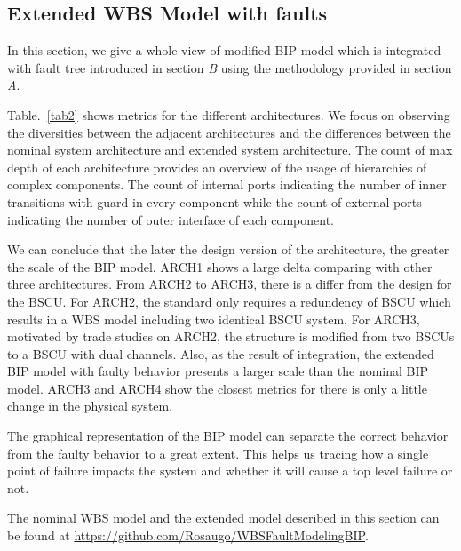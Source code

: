 \subsection{Extended WBS Model with faults}
In this section, we give a whole view of modified BIP model which is integrated with fault tree introduced in section \emph{B} using the methodology provided in section \emph{A}.

Table.~\ref{tab2} shows metrics for the different architectures. We focus on observing the diversities between the adjacent architectures and the differences between the nominal system architecture and extended system architecture. The count of max depth of each architecture provides an overview of the usage of hierarchies of complex components. The count of internal ports indicating the number of inner transitions with guard in every component while the count of external ports indicating the number of outer interface of each component.

We can conclude that the later the design version of the architecture, the greater the scale of the BIP model. ARCH1 shows a large delta comparing with other three architectures. From ARCH2 to ARCH3, there is a differ from the design for the BSCU. For ARCH2, the standard only requires a redundency of BSCU which results in a WBS model including two identical BSCU system. For ARCH3, motivated by trade studies on ARCH2, the structure is modified from two BSCUs to a BSCU with dual channels. Also, as the result of integration, the extended BIP model with faulty behavior presents a larger scale than the nominal BIP model. ARCH3 and ARCH4 show the closest metrics for there is only a little change in the physical system.

The graphical representation of the BIP model can separate the correct behavior from the faulty behavior to a great extent. This helps us tracing how a single point of failure impacts the system and whether it will cause a top level failure or not.


The nominal WBS model and the extended model described in this section can be found at \href{https://github.com/Rosaugo/WBSFaultModelingBIP}{https://github.com/Rosaugo/WBSFaultModelingBIP}. 

